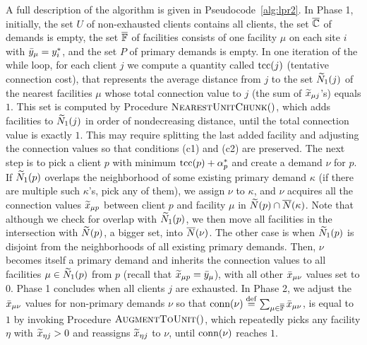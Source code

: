 \documentclass[11pt]{article}
\begin{document}
A full description of the algorithm is given in
Pseudocode~\ref{alg:lpr2}. In Phase 1, initially, the set $U$ of
non-exhausted clients contains all clients, the set $\overline{\mathbb{C}}$ of
demands is empty, the set $\overline{\mathbb{F}}$ of facilities consists of one
facility $\mu$ on each site $i$ with ${\bar y}_\mu = y^\ast_i$, and the
set $P$ of primary demands is empty.  In one iteration of the while
loop, for each client $j$ we compute a quantity called $\textrm{tcc}(j)$
(tentative connection cost), that represents the average distance from
$j$ to the set ${\widetilde N}_1(j)$ of the nearest facilities $\mu$ whose
total connection value to $j$ (the sum of ${\widetilde x}_{\mu j}$'s) equals
$1$.  This set is computed by Procedure ${\textsc{NearestUnitChunk}}()$, which
adds facilities to ${\widetilde N}_1(j)$ in order of nondecreasing distance,
until the total connection value is exactly $1$. This may require
splitting the last added facility and adjusting the connection values
so that conditions (c1) and (c2) are preserved. The next step is to
pick a client $p$ with minimum $\textrm{tcc}(p)+\alpha_p^\ast$ and create a
demand $\nu$ for $p$. If ${\widetilde N}_1(p)$ overlaps the neighborhood of
some existing primary demand $\kappa$ (if there are multiple such
$\kappa$'s, pick any of them), we assign $\nu$ to $\kappa$, and $\nu$
acquires all the connection values ${\widetilde x}_{\mu p}$ between client
$p$ and facility $\mu$ in ${\widetilde N}(p)\cap {\overline{N}}(\kappa)$. Note that
although we check for overlap with ${\widetilde N}_1(p)$, we then move all
facilities in the intersection with ${\widetilde N}(p)$, a bigger set, into
${\overline{N}}(\nu)$.  The other case is when ${\widetilde N}_1(p)$ is disjoint
from the neighborhoods of all existing primary demands. Then, $\nu$
becomes itself a primary demand and inherits the connection values to
all facilities $\mu\in{\widetilde N}_1(p)$ from $p$ (recall that
${\widetilde x}_{\mu p} = {\bar y}_{\mu}$), with all other ${\bar x}_{\mu\nu}$
values set to $0$. Phase 1 concludes when all clients $j$ are
exhausted. In Phase 2, we adjust the ${\bar x}_{\mu\nu}$ values for
non-primary demands $\nu$ so that ${\textrm{conn}}(\nu)
\stackrel{\mathrm{def}}{=} \sum_{\mu\in\overline{\mathbb{F}}}{\bar x}_{\mu \nu}$,
is equal to $1$ by invoking Procedure ${\textsc{AugmentToUnit}}()$, which
repeatedly picks any facility $\eta$ with ${\widetilde x}_{\eta j} >0$ and
reassigns ${\widetilde x}_{\eta j}$ to $\nu$, until ${\textrm{conn}}(\nu)$ reaches
$1$.

\end{document}
